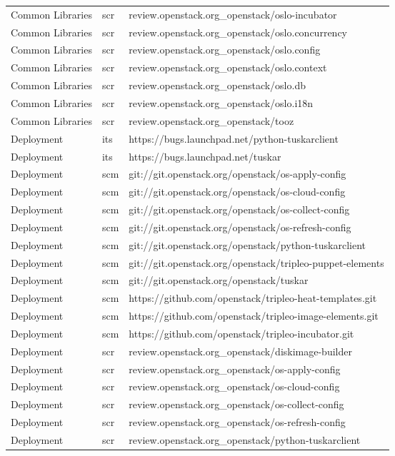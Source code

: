 \begin{center}
\begin{longtable}{|p{4cm}|p{1cm}|p{10cm}|}
Common Libraries&scr&review.openstack.org\_openstack/oslo-incubator\\ 
Common Libraries&scr&review.openstack.org\_openstack/oslo.concurrency\\ 
Common Libraries&scr&review.openstack.org\_openstack/oslo.config\\ 
Common Libraries&scr&review.openstack.org\_openstack/oslo.context\\ 
Common Libraries&scr&review.openstack.org\_openstack/oslo.db\\ 
Common Libraries&scr&review.openstack.org\_openstack/oslo.i18n\\ 
Common Libraries&scr&review.openstack.org\_openstack/tooz\\ 
Deployment&its&https://bugs.launchpad.net/python-tuskarclient\\ 
Deployment&its&https://bugs.launchpad.net/tuskar\\ 
Deployment&scm&git://git.openstack.org/openstack/os-apply-config\\ 
Deployment&scm&git://git.openstack.org/openstack/os-cloud-config\\ 
Deployment&scm&git://git.openstack.org/openstack/os-collect-config\\ 
Deployment&scm&git://git.openstack.org/openstack/os-refresh-config\\ 
Deployment&scm&git://git.openstack.org/openstack/python-tuskarclient\\ 
Deployment&scm&git://git.openstack.org/openstack/tripleo-puppet-elements\\ 
Deployment&scm&git://git.openstack.org/openstack/tuskar\\ 
Deployment&scm&https://github.com/openstack/tripleo-heat-templates.git\\ 
Deployment&scm&https://github.com/openstack/tripleo-image-elements.git\\ 
Deployment&scm&https://github.com/openstack/tripleo-incubator.git\\ 
Deployment&scr&review.openstack.org\_openstack/diskimage-builder\\ 
Deployment&scr&review.openstack.org\_openstack/os-apply-config\\ 
Deployment&scr&review.openstack.org\_openstack/os-cloud-config\\ 
Deployment&scr&review.openstack.org\_openstack/os-collect-config\\ 
Deployment&scr&review.openstack.org\_openstack/os-refresh-config\\ 
Deployment&scr&review.openstack.org\_openstack/python-tuskarclient\\ 

\end{longtable}
\end{center}
